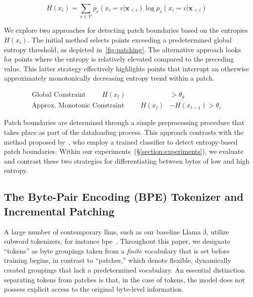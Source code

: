 \begin{equation}
H(x_i) = \sum_{v \in \mathcal{V}} p_{e}(x_i=v|\pmb{x}_{<i}) \log p_{e}(x_i=v|\pmb{x}_{<i})
\end{equation}

We explore two approaches for detecting patch boundaries based on the entropies $H(x_i)$. The initial method selects points exceeding a predetermined global entropy threshold, as depicted in~\autoref{fig:patching}. The alternative approach looks for points where the entropy is relatively elevated compared to the preceding value. This latter strategy effectively highlights points that interrupt an otherwise approximately monotonically decreasing entropy trend within a patch.

\begin{align*}
    \text{Global Constraint}\hspace{1cm}H(x_t)& > \theta_g\\
    \text{Approx. Monotonic Constraint}\hspace{1cm}H(x_t)& - H(x_{t-1}) > \theta_r
\end{align*}

Patch boundaries are determined through a simple preprocessing procedure that takes place as part of the dataloading process. This approach contrasts with the method proposed by~\citet{nawrot-etal-2023-efficient}, who employ a trained classifier to detect entropy-based patch boundaries. Within our experiments~(\S\ref{section:experiments}), we evaluate and contrast these two strategies for differentiating between bytes of low and high entropy.

\subsection{The Byte-Pair Encoding (BPE) Tokenizer and Incremental Patching}
\label{section:incremental-patching}
\label{section:bpe-patch}

A large number of contemporary llms, such as our baseline Llama 3, utilize subword tokenizers, for instance bpe~\citep{gage1994new, sennrich-etal-2016-neural}. Throughout this paper, we designate ``tokens'' as byte groupings taken from a \textit{finite} vocabulary that is set before training begins, in contrast to ``patches,'' which denote flexible, dynamically created groupings that lack a predetermined vocabulary. An essential distinction separating tokens from patches is that, in the case of tokens, the model does not possess explicit access to the original byte-level information.

